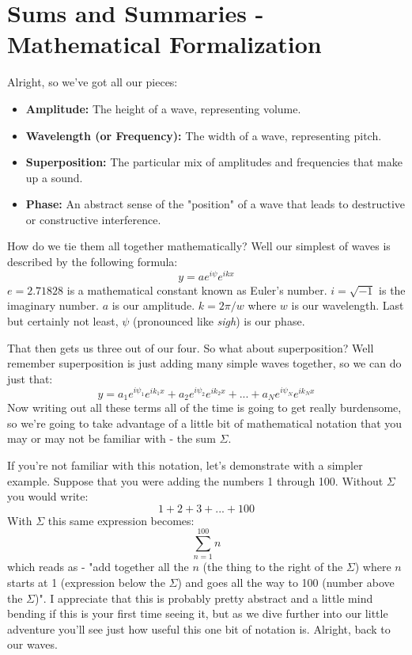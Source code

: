 \documentclass[12pt,a6paper]{book}
\begin{document}
\section{Sums and Summaries - Mathematical Formalization}
Alright, so we've got all our pieces:
\begin{itemize}
\item \textbf{Amplitude:} The height of a wave, representing volume.
\item \textbf{Wavelength (or Frequency):} The width of a wave, representing pitch.
\item \textbf{Superposition:} The particular mix of amplitudes and frequencies that make up a sound.
\item \textbf{Phase:} An abstract sense of the "position" of a wave that leads to destructive or constructive interference.
\end{itemize}

How do we tie them all together mathematically? Well our simplest of waves is described by the following formula:
\begin{equation}
y=a e^{i\psi}e^{ikx}
\end{equation}
$e=2.71828$ is a mathematical constant known as Euler's number. $i=\sqrt{-1}$ is the imaginary number. $a$ is our amplitude. $k=2\pi/w$ where $w$ is our wavelength. Last but certainly not least, $\psi$ (pronounced like \textit{sigh}) is our phase. 

That then gets us three out of our four. So what about superposition? Well remember superposition is just adding many simple waves together, so we can do just that: 
\begin{equation}
y = a_1 e^{i\psi_1}e^{ik_1x} + a_2 e^{i\psi_2}e^{ik_2x} + ... + a_N e^{i\psi_N}e^{ik_Nx}
\end{equation}
Now writing out all these terms all of the time is going to get really burdensome, so we're going to take advantage of a little bit of mathematical notation that you may or may not be familiar with - the sum $\Sigma$. 

If you're not familiar with this notation, let's demonstrate with a simpler example. Suppose that you were adding the numbers 1 through 100. Without $\Sigma$ you would write:
\begin{equation}
1 + 2 + 3 + ... + 100
\end{equation}
With $\Sigma$ this same expression becomes:
\begin{equation}
\sum_{n=1}^{100}n
\end{equation}
which reads as - "add together all the $n$ (the thing to the right of the $\Sigma$) where $n$ starts at 1 (expression below the $\Sigma$) and goes all the way to 100 (number above the $\Sigma$)". I appreciate that this is probably pretty abstract and a little mind bending if this is your first time seeing it, but as we dive further into our little adventure you'll see just how useful this one bit of notation is. Alright, back to our waves.
\end{document}
